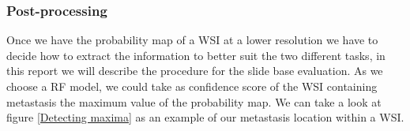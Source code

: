\documentclass[a4paper,10pt]{article}
\begin{document}
\subsubsection{Post-processing}

Once we have the probability map of a WSI at a lower resolution we have to decide how to extract the information to better suit the two different tasks, in this report we will describe the procedure for the slide base evaluation. As we choose a RF model, we could take as confidence score of the WSI containing metastasis the maximum value of the probability map. 
We can take a look at figure \ref{Detecting maxima} as an example of our metastasis location within a WSI.
\end{document}
